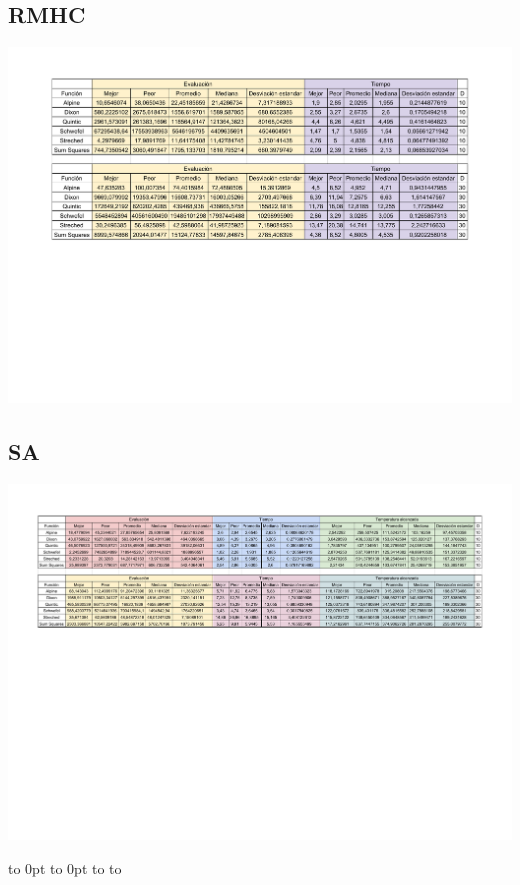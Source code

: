 \documentclass[10pt]{article}
\def\fillandplacepagenumber{%
 \par\pagestyle{empty}%
 \vbox to 0pt{\vss}\vfill
 \vbox to 0pt{\baselineskip0pt
   \hbox to\linewidth{\hss}%
   \baselineskip\footskip
   \hbox to\linewidth{%
     \hfil\thepage\hfil}\vss}}
\begin{document}
\subsection{RMHC}
\begin{center}
  \includegraphics[scale=0.65]{docs/RMHC_SA_Metaheuristics-RMHC.pdf}
\end{center}
\begin{landscape}
  \subsection{SA}
  \begin{center}
    \includegraphics[scale=0.75]{docs/RMHC_SA_Metaheuristics-SA.pdf}
    \fillandplacepagenumber
  \end{center}
\end{landscape}
\end{document}
